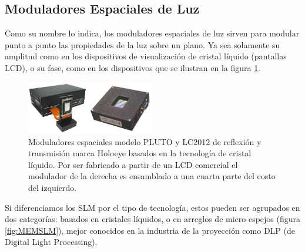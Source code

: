 \subsection{Moduladores Espaciales de Luz}

Como su nombre lo indica, los moduladores espaciales de luz sirven
para modular punto a punto las propiedades de la luz sobre un
plano. Ya sea solamente su amplitud como en los dispositivos de
visualización de cristal líquido (pantallas LCD), o su fase, como en
los dispositivos que se ilustran en la figura \ref{fig:LCDSLM}.
\begin{figure}[h!]
\centering
    \includegraphics[width=0.5\textwidth]{LCDSLM.png}
\caption[Comparación entre TN-SLM]{Moduladores espaciales modelo PLUTO y LC2012 de reflexión y
  transmisión marca Holoeye basados en la tecnología de cristal
  líquido. Por ser fabricado a partir de un LCD comercial el modulador de
  la derecha es ensamblado a una cuarta parte del costo del izquierdo.}
\label{fig:LCDSLM}
\end{figure}

Si diferenciamos los SLM por el tipo de tecnología, estos pueden ser
agrupados en dos categorías: basados en cristales líquidos, o en
arreglos de micro espejos (figura \ref{fig:MEMSLM}), mejor 
conocidos en la industria de la proyección como DLP (de Digital Light
Processing).  
